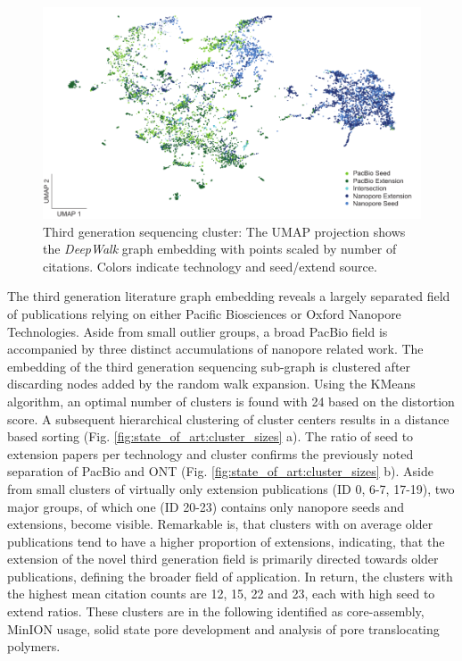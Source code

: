 \begin{figure}[h]
	\centering
	\includegraphics[width=1.0\textwidth]{figures/state_of_art/umap_lr.pdf}
	\captionsetup{format=plain}
	\caption[Third generation sequencing cluster]{Third generation sequencing cluster: The UMAP projection shows the \textit{DeepWalk} graph embedding with points scaled by number of citations. Colors indicate technology and seed/extend source.}
	\label{fig:state_of_art:umap_lr}
\end{figure}

The third generation literature graph embedding reveals a largely separated field of publications relying on either Pacific Biosciences or Oxford Nanopore Technologies.
Aside from small outlier groups, a broad PacBio field is accompanied by three distinct accumulations of nanopore related work.
The embedding of the third generation sequencing sub-graph is clustered after discarding nodes added by the random walk expansion.
Using the KMeans algorithm, an optimal number of clusters is found with 24 based on the distortion score.
A subsequent hierarchical clustering of cluster centers results in a distance based sorting (Fig. \ref{fig:state_of_art:cluster_sizes} a).
The ratio of seed to extension papers per technology and cluster confirms the previously noted separation of PacBio and ONT (Fig. \ref{fig:state_of_art:cluster_sizes} b).
Aside from small clusters of virtually only extension publications (ID 0, 6-7, 17-19), two major groups, of which one (ID 20-23) contains only nanopore seeds and extensions, become visible.
Remarkable is, that clusters with on average older publications tend to have a higher proportion of extensions, indicating, that the extension of the novel third generation field is primarily directed towards older publications, defining the broader field of application.
In return, the clusters with the highest mean citation counts are 12, 15, 22 and 23, each with high seed to extend ratios.
These clusters are in the following identified as core-assembly, MinION usage, solid state pore development and analysis of pore translocating polymers.

